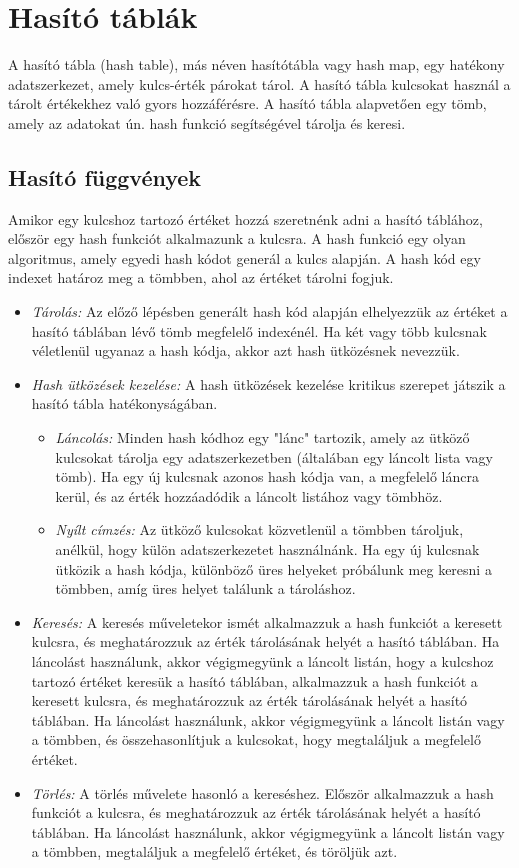 \documentclass[margin=0px]{article}
\begin{document}
\section{Hasító táblák}
A hasító tábla (hash table), más néven hasítótábla vagy hash map, egy hatékony adatszerkezet, amely kulcs-érték párokat tárol.
A hasító tábla kulcsokat használ a tárolt értékekhez való gyors hozzáférésre. 
A hasító tábla alapvetően egy tömb, amely az adatokat ún. hash funkció segítségével tárolja és keresi.
\subsection{Hasító függvények}
Amikor egy kulcshoz tartozó értéket hozzá szeretnénk adni a hasító táblához,
először egy hash funkciót alkalmazunk a kulcsra. A hash funkció egy olyan algoritmus, amely egyedi hash kódot generál a kulcs alapján.
A hash kód egy indexet határoz meg a tömbben, ahol az értéket tárolni fogjuk.
\begin{itemize}
    \item \textit{Tárolás:} Az előző lépésben generált hash kód alapján elhelyezzük az értéket a hasító táblában lévő tömb megfelelő indexénél. Ha két vagy több kulcsnak véletlenül ugyanaz a hash kódja, akkor azt hash ütközésnek nevezzük.
    \item \textit{Hash ütközések kezelése:} A hash ütközések kezelése kritikus szerepet játszik a hasító tábla hatékonyságában.
    \begin{itemize}
        \item \textit{Láncolás:} Minden hash kódhoz egy "lánc" tartozik, amely az ütköző kulcsokat tárolja egy adatszerkezetben (általában egy láncolt lista vagy tömb). Ha egy új kulcsnak azonos hash kódja van, a megfelelő láncra kerül, és az érték hozzáadódik a láncolt listához vagy tömbhöz.
        \item \textit{Nyílt címzés:} Az ütköző kulcsokat közvetlenül a tömbben tároljuk, anélkül, hogy külön adatszerkezetet használnánk. Ha egy új kulcsnak ütközik a hash kódja, különböző üres helyeket próbálunk meg keresni a tömbben, amíg üres helyet találunk a tároláshoz.
    \end{itemize}
    \item \textit{Keresés:} A keresés műveletekor ismét alkalmazzuk a hash funkciót a keresett kulcsra, és meghatározzuk az érték tárolásának helyét a hasító táblában. Ha láncolást használunk, akkor végigmegyünk a láncolt listán, hogy a kulcshoz tartozó értéket keresük a hasító táblában, alkalmazzuk a hash funkciót a keresett kulcsra, és meghatározzuk az érték tárolásának helyét a hasító táblában. Ha láncolást használunk, akkor végigmegyünk a láncolt listán vagy a tömbben, és összehasonlítjuk a kulcsokat, hogy megtaláljuk a megfelelő értéket.
    \item \textit{Törlés:} A törlés művelete hasonló a kereséshez. Először alkalmazzuk a hash funkciót a kulcsra, és meghatározzuk az érték tárolásának helyét a hasító táblában. Ha láncolást használunk, akkor végigmegyünk a láncolt listán vagy a tömbben, megtaláljuk a megfelelő értéket, és töröljük azt.
\end{itemize}
\end{document}
